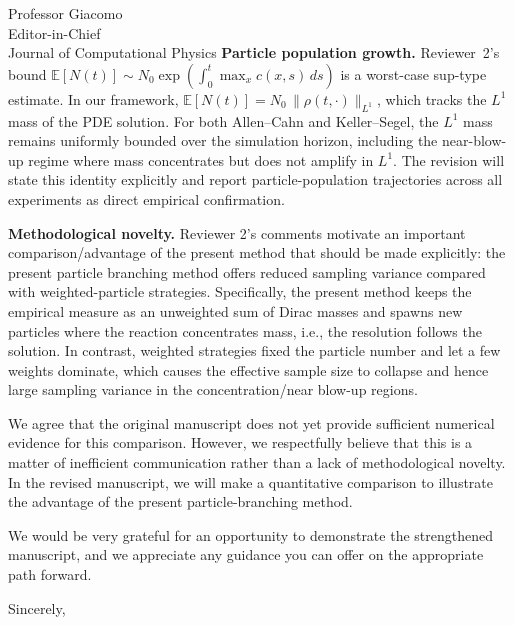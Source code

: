 \documentclass[11pt]{letter}
\begin{document}
\begin{letter}{Professor Giacomo \\ Editor-in-Chief \\ Journal of Computational Physics}
\textbf{Particle population growth.} Reviewer~2's bound $\mathbb{E}[N(t)] \sim N_0 \exp\!\left(\int_0^t \max_x c(x,s)\, ds\right)$ is a worst-case sup-type estimate. In our framework, $\mathbb{E}[N(t)] = N_0\,\|\rho(t,\cdot)\|_{L^1}$, which tracks the $L^1$ mass of the PDE solution. For both Allen--Cahn and Keller--Segel, the $L^1$ mass remains uniformly bounded over the simulation horizon, including the near-blow-up regime where mass concentrates but does not amplify in $L^1$. The revision will state this identity explicitly and report particle-population trajectories across all experiments as direct empirical confirmation.



\textbf{Methodological novelty.} Reviewer 2's comments motivate an important comparison/advantage of the present method that should be made explicitly: the present particle branching method offers reduced sampling variance compared with weighted-particle strategies.  Specifically, the present method keeps the empirical measure as an unweighted sum of Dirac masses and spawns new particles where the reaction concentrates mass, i.e., the resolution follows the solution. In contrast, weighted strategies fixed the particle number and let a few weights dominate, which causes the effective sample size to collapse and hence large sampling variance in the concentration/near blow-up regions.

We agree that the original manuscript does not yet provide sufficient numerical evidence for this comparison. However, we respectfully believe that this is a matter of inefficient communication rather than a lack of methodological novelty. 
In the revised manuscript, we will make a quantitative comparison to illustrate the advantage of the present particle-branching method. 






We would be very grateful for an opportunity to demonstrate the strengthened manuscript, and we appreciate any guidance you can offer on the appropriate path forward.

\closing{Sincerely,}

\end{letter}
\end{document}

